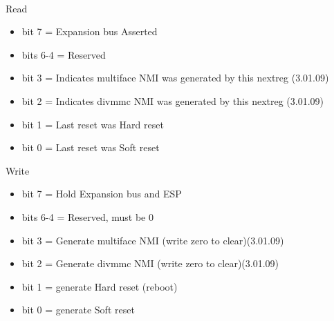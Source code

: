 \\
Read
\begin{itemize}
\item bit 7 = Expansion bus  Asserted
\item bits 6-4 = Reserved
\item bit 3 = Indicates multiface NMI was generated by this nextreg (3.01.09)
\item bit 2 = Indicates divmmc NMI was generated by this nextreg (3.01.09)
\item bit 1 = Last reset was Hard reset
\item bit 0 = Last reset was Soft reset
\end{itemize}
Write
\begin{itemize}
\item bit 7 = Hold Expansion bus and ESP 
\item bits 6-4 = Reserved, must be 0
\item bit 3 = Generate multiface NMI (write zero to clear)(3.01.09)
\item bit 2 = Generate divmmc NMI (write zero to clear)(3.01.09)
\item bit 1 = generate Hard reset (reboot)
\item bit 0 = generate Soft reset
\end{itemize}

